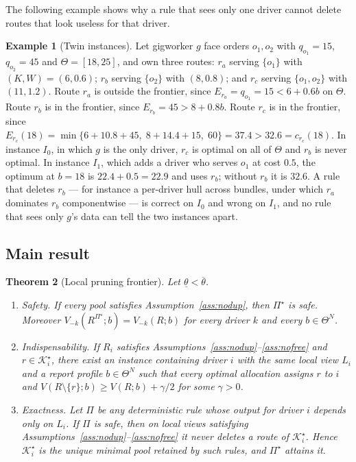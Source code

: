 \documentclass[review,12pt]{elsarticle}
\newtheorem{theorem}{Theorem}
\theoremstyle{definition}
\newtheorem{example}[theorem]{Example}
\theoremstyle{remark}
\newcommand{\Kstar}{\mathcal{K}^\star}
\newcommand{\lth}{\underline{\theta}}
\newcommand{\uth}{\overline{\theta}}
\begin{document}
The following example shows why a rule that sees only one driver cannot
delete routes that look useless for that driver.

\begin{example}[Twin instances]
\label{ex:twin}
Let gigworker $g$ face orders $o_1,o_2$ with $q_{o_1}=15$, $q_{o_2}=45$ and
$\Theta=[18,25]$, and own three routes: $r_a$ serving $\{o_1\}$ with
$(K,W)=(6,0.6)$; $r_b$ serving $\{o_2\}$ with $(8,0.8)$; and $r_c$ serving
$\{o_1,o_2\}$ with $(11,1.2)$. Route $r_a$ is outside the frontier, since
$E_{r_a}=q_{o_1}=15<6+0.6b$ on $\Theta$. Route $r_b$ is in the frontier,
since $E_{r_b}=45>8+0.8b$. Route $r_c$ is in the frontier, since
$E_{r_c}(18)=\min\{6+10.8+45,\;8+14.4+15,\;60\}=37.4>32.6=c_{r_c}(18)$. In
instance $I_0$, in which $g$ is the only driver, $r_c$ is optimal on all of
$\Theta$ and $r_b$ is never optimal. In instance $I_1$, which adds a driver
who serves $o_1$ at cost $0.5$, the optimum at $b=18$ is
$22.4+0.5=22.9$ and uses $r_b$; without $r_b$ it is $32.6$. A rule that
deletes $r_b$ --- for instance a per-driver hull across bundles, under which
$r_a$ dominates $r_b$ componentwise --- is correct on $I_0$ and wrong on
$I_1$, and no rule that sees only $g$'s data can tell the two instances
apart.
\end{example}

\subsection{Main result}

\begin{theorem}[Local pruning frontier]
\label{thm:frontier}
Let $\lth<\uth$.
\begin{enumerate}
\item[(a)] \emph{Safety.} If every pool satisfies
Assumption~\ref{ass:nodup}, then $\Pi^\star$ is safe. Moreover
$V_{-k}(R^{\Pi^\star};b)=V_{-k}(R;b)$ for every driver $k$ and every
$b\in\Theta^N$.
\item[(b)] \emph{Indispensability.} If $R_i$ satisfies
Assumptions~\ref{ass:nodup}--\ref{ass:nofree} and $r\in\Kstar_i$, there
exist an instance containing driver $i$ with the same local view $L_i$ and
a report profile $b\in\Theta^N$ such that every optimal allocation assigns
$r$ to $i$ and $V(R\setminus\{r\};b)\ge V(R;b)+\gamma/2$ for some
$\gamma>0$.
\item[(c)] \emph{Exactness.} Let $\Pi$ be any deterministic rule whose
output for driver $i$ depends only on $L_i$. If $\Pi$ is safe, then on local
views satisfying Assumptions~\ref{ass:nodup}--\ref{ass:nofree} it never
deletes a route of $\Kstar_i$. Hence $\Kstar_i$ is the unique minimal pool
retained by such rules, and $\Pi^\star$ attains it.
\end{enumerate}
\end{theorem}
\end{document}
